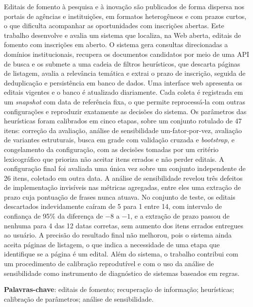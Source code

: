 
\setlength{\absparsep}{18pt}
\begin{resumo}
Editais de fomento à pesquisa e à inovação são publicados de forma dispersa
nos portais de agências e instituições, em formatos heterogêneos e com prazos
curtos, o que dificulta acompanhar as oportunidades com inscrições abertas.
Este trabalho desenvolve e avalia um sistema que localiza, na Web aberta,
editais de fomento com inscrições em aberto. O sistema gera consultas
direcionadas a domínios institucionais, recupera os documentos candidatos por
meio de uma API de busca e os submete a uma cadeia de filtros heurísticos, que
descarta páginas de listagem, avalia a relevância temática e extrai o prazo de
inscrição, seguida de deduplicação e persistência em banco de dados. Uma
interface web apresenta os editais vigentes e o banco é atualizado
diariamente. Cada coleta é registrada em um \textit{snapshot} com data de
referência fixa, o que permite reprocessá-la com outras configurações e
reproduzir exatamente as decisões do sistema. Os parâmetros das heurísticas
foram calibrados em cinco etapas, sobre um conjunto rotulado de 47 itens:
correção da avaliação, análise de sensibilidade um-fator-por-vez, avaliação de
variantes estruturais, busca em grade com validação cruzada e
\textit{bootstrap}, e congelamento da configuração, com as decisões tomadas por
um critério lexicográfico que prioriza não aceitar itens errados e não perder
editais. A configuração final foi avaliada uma única vez sobre um conjunto
independente de 26 itens, coletado em outra data. A análise de sensibilidade
revelou três defeitos de implementação invisíveis nas métricas agregadas,
entre eles uma extração de prazo cuja pontuação de frases nunca atuava. No
conjunto de teste, os editais descartados indevidamente caíram de 5 para 1
entre 14, com intervalo de confiança de 95\% da diferença de $-8$ a $-1$, e a
extração de prazo passou de nenhuma para 4 das 12 datas corretas, sem aumento
dos itens errados entregues ao usuário. A precisão do resultado final não
melhorou, pois o sistema ainda aceita páginas de listagem, o que indica a
necessidade de uma etapa que identifique se a página é um edital. Além do
sistema, o trabalho contribui com um procedimento de calibração reprodutível
e com o uso da análise de sensibilidade como instrumento de diagnóstico de
sistemas baseados em regras.

\vspace{\onelineskip}

\noindent
\textbf{Palavras-chave}: editais de fomento; recuperação de informação;
heurísticas; calibração de parâmetros; análise de sensibilidade.
\end{resumo}


